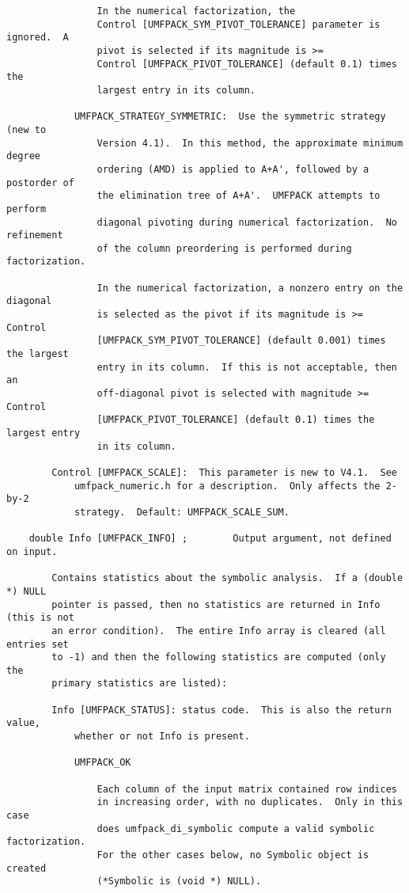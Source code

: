 \documentclass[11pt]{article}
\begin{document}
{\begin{verbatim}
                In the numerical factorization, the
                Control [UMFPACK_SYM_PIVOT_TOLERANCE] parameter is ignored.  A
                pivot is selected if its magnitude is >=
                Control [UMFPACK_PIVOT_TOLERANCE] (default 0.1) times the
                largest entry in its column.

            UMFPACK_STRATEGY_SYMMETRIC:  Use the symmetric strategy (new to
                Version 4.1).  In this method, the approximate minimum degree
                ordering (AMD) is applied to A+A', followed by a postorder of
                the elimination tree of A+A'.  UMFPACK attempts to perform
                diagonal pivoting during numerical factorization.  No refinement
                of the column preordering is performed during factorization.

                In the numerical factorization, a nonzero entry on the diagonal
                is selected as the pivot if its magnitude is >= Control
                [UMFPACK_SYM_PIVOT_TOLERANCE] (default 0.001) times the largest
                entry in its column.  If this is not acceptable, then an
                off-diagonal pivot is selected with magnitude >= Control
                [UMFPACK_PIVOT_TOLERANCE] (default 0.1) times the largest entry
                in its column.

        Control [UMFPACK_SCALE]:  This parameter is new to V4.1.  See
            umfpack_numeric.h for a description.  Only affects the 2-by-2
            strategy.  Default: UMFPACK_SCALE_SUM.

    double Info [UMFPACK_INFO] ;        Output argument, not defined on input.

        Contains statistics about the symbolic analysis.  If a (double *) NULL
        pointer is passed, then no statistics are returned in Info (this is not
        an error condition).  The entire Info array is cleared (all entries set
        to -1) and then the following statistics are computed (only the
        primary statistics are listed):

        Info [UMFPACK_STATUS]: status code.  This is also the return value,
            whether or not Info is present.

            UMFPACK_OK

                Each column of the input matrix contained row indices
                in increasing order, with no duplicates.  Only in this case
                does umfpack_di_symbolic compute a valid symbolic factorization.
                For the other cases below, no Symbolic object is created
                (*Symbolic is (void *) NULL).


\end{verbatim}}
\end{document}
